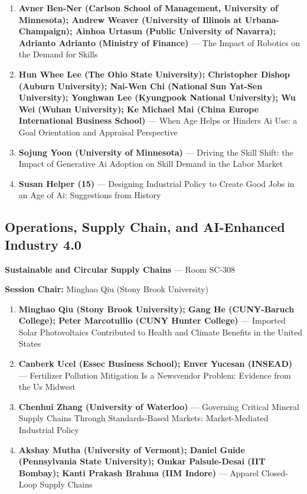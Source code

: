 \documentclass[
  10pt,
  letterpaper,
  DIV=11,
  numbers=noendperiod]{scrartcl}
\begin{document}
\begin{enumerate}
\def\labelenumi{\arabic{enumi}.}
\item
  \textbf{Avner Ben-Ner (Carlson School of Management, University of
  Minnesota); Andrew Weaver (University of Illinois at
  Urbana-Champaign); Ainhoa Urtasun (Public University of Navarra);
  Adrianto Adrianto (Ministry of Finance)} --- The Impact of Robotics on
  the Demand for Skills
\item
  \textbf{Hun Whee Lee (The Ohio State University); Christopher Dishop
  (Auburn University); Nai-Wen Chi (National Sun Yat-Sen University);
  Yonghwan Lee (Kyungpook National University); Wu Wei (Wuhan
  University); Ke Michael Mai (China Europe International Business
  School)} --- When Age Helps or Hinders Ai Use: a Goal Orientation and
  Appraisal Perspective
\item
  \textbf{Sojung Yoon (University of Minnesota)} --- Driving the Skill
  Shift: the Impact of Generative Ai Adoption on Skill Demand in the
  Labor Market
\item
  \textbf{Susan Helper (15)} --- Designing Industrial Policy to Create
  Good Jobs in an Age of Ai: Suggestions from History
\end{enumerate}

\subsection{\texorpdfstring{\textcolor{operations}{Operations, Supply Chain, and AI-Enhanced Industry 4.0}}{}}\label{section-57}

\textbf{Sustainable and Circular Supply Chains} --- Room SC-308

\textbf{Session Chair:} Minghao Qiu (Stony Brook University)

\begin{enumerate}
\def\labelenumi{\arabic{enumi}.}
\item
  \textbf{Minghao Qiu (Stony Brook University); Gang He (CUNY-Baruch
  College); Peter Marcotullio (CUNY Hunter College)} --- Imported Solar
  Photovoltaics Contributed to Health and Climate Benefits in the United
  States
\item
  \textbf{Canberk Ucel (Essec Business School); Enver Yucesan (INSEAD)}
  --- Fertilizer Pollution Mitigation Is a Newsvendor Problem: Evidence
  from the Us Midwest
\item
  \textbf{Chenhui Zhang (University of Waterloo)} --- Governing Critical
  Mineral Supply Chains Through Standards-Based Markets: Market-Mediated
  Industrial Policy
\item
  \textbf{Akshay Mutha (University of Vermont); Daniel Guide
  (Pennsylvania State University); Omkar Palsule-Desai (IIT Bombay);
  Kanti Prakash Brahma (IIM Indore)} --- Apparel Closed-Loop Supply
  Chains
\end{enumerate}
\end{document}
